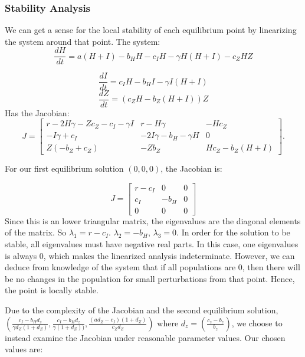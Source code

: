 \documentclass[
	12pt
]{article}
\begin{document}
\subsubsection{Stability Analysis}

We can get a sense for the local stability of each equilibrium point by linearizing the system around that point. The system:
\begin{equation}
\frac{dH}{dt} = a(H+I)-b_HH-c_IH-\gamma H(H+I)-c_ZHZ
\end{equation}

\begin{equation}
\frac{dI}{dt} = c_IH-b_HI-\gamma I(H+I)
\end{equation}
\begin{equation}
\frac{dZ}{dt} = (c_ZH-b_Z(H+I))Z
\end{equation}
Has the Jacobian:
\begin{equation}
J = \begin{bmatrix}
r-2H\gamma - Zc_Z - c_I - \gamma I & r-H\gamma & -Hc_Z \\
-I\gamma + c_I & -2I\gamma - b_H - \gamma H & 0 \\
 Z(-b_Z + c_Z) & -Zb_Z & Hc_Z - b_Z(H + I)
\end{bmatrix}.
\end{equation}

For our first equilibrium solution $(0, 0, 0)$, the Jacobian is:

\begin{equation}
J=\begin{bmatrix} r-c_I& 0 & 0 \\ c_I & - b_H & 0 \\ 0 & 0 & 0 \end{bmatrix}
\end{equation}
Since this is an lower triangular matrix, the eigenvalues are the diagonal elements of the matrix. So $\lambda_1=r-c_I$. $\lambda_2=-b_H$, $\lambda_3=0$. In order for the solution to be stable, all eigenvalues must have negative real parts. In this case, one eigenvalues is always $0$, which makes the linearized analysis indeterminate. However, we can deduce from knowledge of the system that if all populations are $0$, then there will be no changes in the population for small perturbations from that point. Hence, the point is locally stable.

Due to the complexity of the Jacobian and the second equilibrium solution, $(\frac{c_I-b_Hd_z}{\gamma d_Z(1+d_Z)},  \frac{c_I-b_Hd_z}{\gamma (1+d_Z))} , \frac{(ad_Z-c_I)(1+d_Z)}{c_Zd_Z})$ where $d_z = \left(\frac{c_z-b_z}{b_z}\right)$, we choose to instead examine the Jacobian under reasonable parameter values. Our chosen values are:
\end{document}
